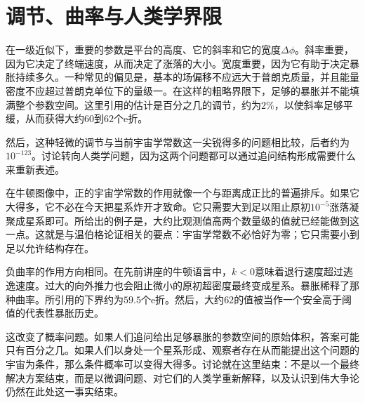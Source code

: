 \section{调节、曲率与人类学界限}

在一级近似下，重要的参数是平台的高度、它的斜率和它的宽度\(\Delta\phi\)。斜率重要，因为它决定了终端速度，从而决定了涨落的大小。宽度重要，因为它有助于决定暴胀持续多久。一种常见的偏见是，基本的场偏移不应远大于普朗克质量，并且能量密度不应超过普朗克单位下的量级一。在这样的粗略界限下，足够的暴胀并不能填满整个参数空间。这里引用的估计是百分之几的调节，约为\(2\%\)，以使斜率足够平缓，从而获得大约\(60\)到\(62\)个e折。

\begin{classroomqa}
\end{classroomqa}

然后，这种轻微的调节与当前宇宙学常数这一尖锐得多的问题相比较，后者约为\(10^{-123}\)。讨论转向人类学问题，因为这两个问题都可以通过追问结构形成需要什么来重新表述。

在牛顿图像中，正的宇宙学常数的作用就像一个与距离成正比的普遍排斥。如果它大得多，它不必在今天把星系炸开才致命。它只需要大到足以阻止原初\(10^{-5}\)涨落凝聚成星系即可。所给出的例子是，大约比观测值高两个数量级的值就已经能做到这一点。这就是与温伯格论证相关的要点：宇宙学常数不必恰好为零；它只需要小到足以允许结构存在。

负曲率的作用方向相同。在先前讲座的牛顿语言中，\(k<0\)意味着退行速度超过逃逸速度。过大的向外推力也会阻止微小的原初超密度最终变成星系。暴胀稀释了那种曲率。所引用的下界约为\(59.5\)个e折。然后，大约\(62\)的值被当作一个安全高于阈值的代表性暴胀历史。

这改变了概率问题。如果人们追问给出足够暴胀的参数空间的原始体积，答案可能只有百分之几。如果人们以身处一个星系形成、观察者存在从而能提出这个问题的宇宙为条件，那么条件概率可以变得大得多。讨论就在这里结束：不是以一个最终解决方案结束，而是以微调问题、对它们的人类学重新解释，以及认识到伟大争论仍然在此处这一事实结束。
